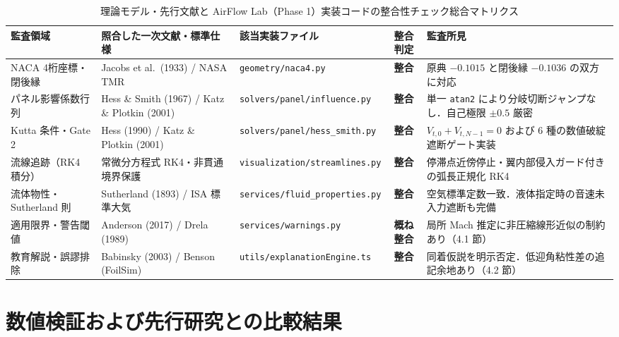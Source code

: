 \documentclass[10pt,a4paper]{article}
\begin{document}
\begin{table}[H]
  \centering
  \caption{理論モデル・先行文献と AirFlow Lab（Phase 1）実装コードの整合性チェック総合マトリクス}
  \label{tab:audit_matrix}
  \footnotesize
  \renewcommand{\arraystretch}{1.28}
  \setlength{\tabcolsep}{4.5pt}
  \begin{tabularx}{\textwidth}{@{}P{27mm}P{36mm}P{35mm}cY@{}}
    \toprule
    \textbf{監査領域} & \textbf{照合した一次文献・標準仕様} & \textbf{該当実装ファイル} & \textbf{整合判定} & \textbf{監査所見} \\
    \midrule
    NACA 4桁座標・閉後縁 & Jacobs et al.\ (1933) / NASA TMR & \texttt{geometry/naca4.py} & \textbf{整合} & 原典 $-0.1015$ と閉後縁 $-0.1036$ の双方に対応 \\
    パネル影響係数行列 & Hess \& Smith (1967) / Katz \& Plotkin (2001) & \texttt{solvers/panel/influence.py} & \textbf{整合} & 単一 \texttt{atan2} により分岐切断ジャンプなし．自己極限 $\pm 0.5$ 厳密 \\
    Kutta 条件・Gate 2 & Hess (1990) / Katz \& Plotkin (2001) & \texttt{solvers/panel/hess\_smith.py} & \textbf{整合} & $V_{t,0}+V_{t,N-1}=0$ および 6 種の数値破綻遮断ゲート実装 \\
    流線追跡（RK4 積分） & 常微分方程式 RK4・非貫通境界保護 & \texttt{visualization/streamlines.py} & \textbf{整合} & 停滞点近傍停止・翼内部侵入ガード付きの弧長正規化 RK4 \\
    流体物性・Sutherland 則 & Sutherland (1893) / ISA 標準大気 & \texttt{services/fluid\_properties.py} & \textbf{整合} & 空気標準定数一致．液体指定時の音速未入力遮断も完備 \\
    適用限界・警告閾値 & Anderson (2017) / Drela (1989) & \texttt{services/warnings.py} & \textbf{概ね整合} & 局所 Mach 推定に非圧縮線形近似の制約あり（4.1 節） \\
    教育解説・誤謬排除 & Babinsky (2003) / Benson (FoilSim) & \texttt{utils/explanationEngine.ts} & \textbf{整合} & 同着仮説を明示否定．低迎角粘性差の追記余地あり（4.2 節） \\
    \bottomrule
  \end{tabularx}
\end{table}

\section{数値検証および先行研究との比較結果}
\end{document}
